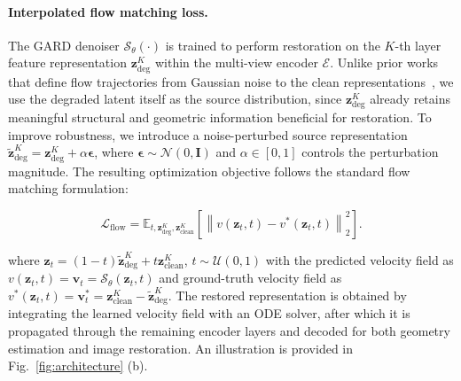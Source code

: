 \documentclass{llmxive}
\begin{document}
\paragraph{Interpolated flow matching loss.}
The GARD denoiser $\mathcal{S}_{\theta}(\cdot)$ is trained to perform restoration on the $K$-th layer feature representation $\mathbf{z}_{\text{deg}}^{K}$ within the multi-view encoder $\mathcal{E}$. Unlike prior works that define flow trajectories from Gaussian noise to the clean representations~\cite{zheng2025diffusion, duan2025dit4sr}, we use the degraded latent itself as the source distribution, since $\mathbf{z}_{\text{deg}}^{K}$ already retains meaningful structural and geometric information beneficial for restoration. To improve robustness, we introduce a noise-perturbed source representation $\tilde{\mathbf{z}}_{\text{deg}}^{K} = \mathbf{z}_{\text{deg}}^{K} + \alpha \boldsymbol{\epsilon}$, where $\boldsymbol{\epsilon} \sim \mathcal{N}(0,\mathbf{I})$ and $\alpha \in [0,1]$ controls the perturbation magnitude. The resulting optimization objective follows the standard flow matching formulation:

\begin{equation}
\mathcal{L}_{\text{flow}}
=
\mathbb{E}_{t,
\mathbf{z}_{\text{deg}}^{K},
\mathbf{z}_{\text{clean}}^{K}}
\left[
\left\|
{v}(\mathbf{z}_t,t)
-
{v}^{*}(\mathbf{z}_t,t)
\right\|_2^2
\right].
\end{equation}

where $\mathbf{z}_t = (1-t)\tilde{\mathbf{z}}_{\text{deg}}^{K} + t\mathbf{z}_{\text{clean}}^{K}$, $t \sim \mathcal{U}(0,1)$ with the predicted velocity field as ${v}(\mathbf{z}_t,t) = \mathbf{v}_t = \mathcal{S}_{\theta}(\mathbf{z}_t,t)$ and ground-truth velocity field as ${v}^{*}(\mathbf{z}_t,t) = \mathbf{v}^*_t=\mathbf{z}_{\text{clean}}^{K} - \tilde{\mathbf{z}}_{\text{deg}}^{K}$. The restored representation is obtained by integrating the learned velocity field with an ODE solver, after which it is propagated through the remaining encoder layers and decoded for both geometry estimation and image restoration. An illustration is provided in Fig.~\ref{fig:architecture} (b).
\end{document}
